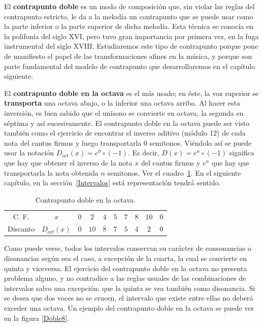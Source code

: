 \documentclass[letterpaper,12pt]{book}
\theoremstyle{definition} \newtheorem{Def}{Definición}[chapter]
\theoremstyle{definition} \newtheorem{Teo}{Teorema}[chapter]
\theoremstyle{definition} \newtheorem{Pro}{Proposición}[chapter]
\theoremstyle{definition} \newtheorem{Lema}{Lema}[chapter]
\begin{document}
El \textbf{contrapunto doble} es un modo de composición que, sin violar las reglas del contrapunto estricto, le da a la melodía un contrapunto que se puede usar como la parte inferior o la parte superior  de dicha melodía. Esta técnica se conocía en la polifonía del siglo XVI, pero tuvo gran importancia por primera vez, en la fuga instrumental del siglo XVIII. Estudiaremos este tipo de contrapunto porque pone de manifiesto el papel de las transformaciones afines en la música, y porque son parte fundamental del modelo de contrapunto que desarrollaremos en el capítulo siguiente. 

El \textbf{contrapunto doble en la octava} es el más usado; en éste, la voz superior se \textbf{transporta} una octava abajo, o la inferior una octava arriba. Al hacer esta inversión, es bien sabido que el unísono se convierte en octava, la segunda en séptima y así sucesivamente. El contrapunto doble en la octava puede ser visto también como el ejercicio de encontrar el inverso aditivo (módulo 12) de cada nota del cantus firmus y luego transportarla 0 semitonos. Viéndolo así se puede usar la notación $D_{oct}(x)=e^0 \circ (-1)$. Es decir, $D(x)=e^n \circ (-1)$ significa que hay que obtener el inverso de la nota $x$ del cantus firmus y $e^n$ que hay que transportarla la nota obtenida $n$ semitonos. Ver el cuadro~\ref{CuadroDoble8}. En el siguiente capítulo, en la sección~\ref{Intervalos} está representación tendrá sentido. 

\begin{table}[h]
\centering
\begin{tabular}{|c c c c c c c c c c | }
\hline
C. F. & $x$ & $0$ & $2$ & $4$ & $5$ & $7$ & $8$ & $10$ & $0$\\
Discanto & $D_{oct}(x)$ & $0$ & $10$ & $8$ & $7$ & $5$ & $4$ & $2$ & $0$\\ 
\hline
\end{tabular}
\caption{\label{CuadroDoble8}Contrapunto doble en la octava.}
\end{table}

Como puede verse, todos los intervalos conservan su carácter de consonancias o disonancias según sea el caso, a excepción de la cuarta, la cual se convierte en quinta y viceversa. El ejercicio  del contrapunto doble en la octava no presenta problema alguno, y no contradice a las reglas usuales de las combinaciones de intervalos salvo una excepción: que la quinta se vea también como disonancia. Si se desea que dos voces no se crucen, el intervalo que existe entre ellas no deberá exceder una octava. Un ejemplo del contrapunto doble en la octava se puede ver en la figura \ref{Doble8}.
\end{document}
